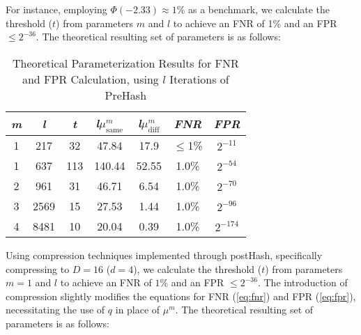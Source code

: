 For instance, employing \(\Phi(-2.33) \approx 1\%\) as a benchmark, we calculate the threshold (\(t\)) from parameters \(m\) and \(l\) to achieve an FNR of 1\% and an FPR \(\leq 2^{-36} \). The theoretical resulting set of parameters is as follows: 

\begin{table}[htbp] 
    \centering
    \begin{tabular}{|c|c|c|c|c|c|c|}
        \hline
        \textit{m} & \textit{l} & \textit{t} & \textit{l}\(\mu_{\text{same}}^m\) & \textit{l}\(\mu_{\text{diff}}^m\) & \textit{FNR} & \textit{FPR} \\
        \hline
        1 & 217 & 32 & 47.84 & 17.9 & \(\leq\)1\% & \(2^{-11}\)\\
        1 & 637 & 113 & 140.44 & 52.55 & 1.0\% & \(2^{-54}\) \\
        2 & 961 & 31 & 46.71 & 6.54 & 1.0\% & \(2^{-70}\) \\
        3 & 2569 & 15 & 27.53 & 1.44 & 1.0\% &\(2^{-96}\) \\
        4 & 8481 & 10 & 20.04 & 0.39 & 1.0\% & \(2^{-174}\) \\
        \hline
    \end{tabular}
    \caption{Theoretical Parameterization Results for FNR and FPR Calculation, using $l$ Iterations of PreHash}
    \label{tab:theoretical_parameterization_PreHash}
\end{table}

Using compression techniques implemented through postHash, specifically compressing to \( D = 16 \) (\( d = 4 \)), we calculate the threshold (\( t \)) from parameters \( m = 1 \) and \( l \) to achieve an FNR of \(1\%\) and an FPR \(\leq 2^{-36} \). The introduction of compression slightly modifies the equations for FNR (\ref{eq:fnr}) and FPR (\ref{eq:fpr}), necessitating the use of \( q \) in place of \(\mu^m\). The theoretical resulting set of parameters is as follows:

